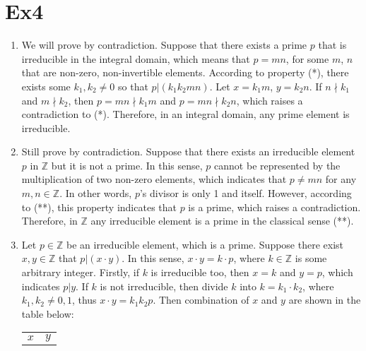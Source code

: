 \documentclass[12pt, a4paper]{article}
\begin{document}
\section*{Ex4}
\begin{enumerate}
    \item We will prove by contradiction.\newline
          Suppose that there exists a prime $p$ that is irreducible in the integral domain, 
          which means that $p = mn$, for some $m$, $n$ that are non-zero, non-invertible elements. 
          According to property (*), there exists some $k_1, k_2 \neq 0$ so that $p|(k_1k_2mn)$. 
          Let $x = k_1m$, $y = k_2n$. If $n\nmid k_1$ and $m\nmid k_2$, then $p = mn\nmid k_1m$ 
          and $p = mn\nmid k_2n$, which raises a contradiction to (*).\newline
          Therefore, in an integral domain, any prime element is irreducible.
    \item Still prove by contradiction.\newline
          Suppose that there exists an irreducible element $p$ in $\mathbb{Z}$ but it is not a prime. 
          In this sense, $p$ cannot be represented by the multiplication of two non-zero elements, 
          which indicates that $p \neq mn$ for any $m, n\in \mathbb{Z}$. In other words, 
          $p$'s divisor is only 1 and itself. However, according to (**), 
          this property indicates that $p$ is a prime, which raises a contradiction.\newline
          Therefore, in $\mathbb{Z}$ any irreducible element is a prime in the classical sense (**).
    \item Let $p\in \mathbb{Z}$ be an irreducible element, which is a prime. 
          Suppose there exist $x, y\in \mathbb{Z}$ that $p | (x\cdot y)$. 
          In this sense, $x\cdot y = k\cdot p$, where $k\in \mathbb{Z}$ is some arbitrary integer.\newline
          Firstly, if $k$ is irreducible too, then $x = k$ and $y = p$, which indicates $p | y$.\newline
          If $k$ is not irreducible, then divide $k$ into $k = k_1\cdot k_2$, where $k_1, k_2 \neq 0, 1$, 
          thus $x\cdot y = k_1k_2p$. Then combination of $x$ and $y$ are shown in the table below:
          \begin{center}
                \begin{tabular}{c|c}
                      \hline
                      $x$ & $y$\\

\end{tabular}
\end{center}
\end{enumerate}
\end{document}
